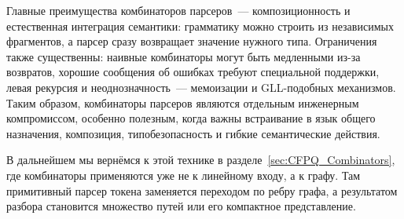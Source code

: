 Главные преимущества комбинаторов парсеров~--- композиционность и естественная интеграция семантики: грамматику можно строить из независимых фрагментов, а парсер сразу возвращает значение нужного типа. Ограничения также существенны: наивные комбинаторы могут быть медленными из-за возвратов, хорошие сообщения об ошибках требуют специальной поддержки, левая рекурсия и неоднозначность~--- мемоизации и GLL-подобных механизмов. Таким образом, комбинаторы парсеров являются отдельным инженерным компромиссом, особенно полезным, когда важны встраивание в язык общего назначения, композиция, типобезопасность и гибкие семантические действия.

В дальнейшем мы вернёмся к этой технике в разделе~\ref{sec:CFPQ_Combinators}, где комбинаторы применяются уже не к линейному входу, а к графу. Там примитивный парсер токена заменяется переходом по ребру графа, а результатом разбора становится множество путей или его компактное представление.
